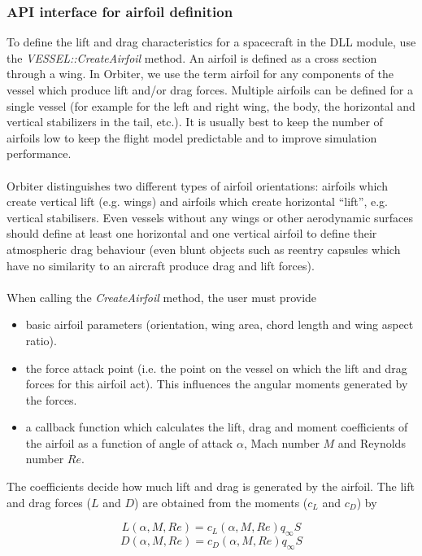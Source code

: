 \documentclass[Orbiter Developer Manual.tex]{subfiles}
\begin{document}
\subsubsection{API interface for airfoil definition}
To define the lift and drag characteristics for a spacecraft in the DLL module, use the \textit{VESSEL::CreateAirfoil} method. An airfoil is defined as a cross section through a wing. In Orbiter, we use the term airfoil for any components of the vessel which produce lift and/or drag forces. Multiple airfoils can be defined for a single vessel (for example for the left and right wing, the body, the horizontal and vertical stabilizers in the tail, etc.). It is usually best to keep the number of airfoils low to keep the flight model predictable and to improve simulation performance.\\
\\
Orbiter distinguishes two different types of airfoil orientations: airfoils which create vertical lift (e.g. wings) and airfoils which create horizontal “lift”, e.g. vertical stabilisers. Even vessels without any wings or other aerodynamic surfaces should define at least one horizontal and one vertical airfoil to define their atmospheric drag behaviour (even blunt objects such as reentry capsules which have no similarity to an aircraft produce drag and lift forces).\\
\\
When calling the \textit{CreateAirfoil} method, the user must provide
\begin{itemize}
\item basic airfoil parameters (orientation, wing area, chord length and wing aspect ratio).
\item the force attack point (i.e. the point on the vessel on which the lift and drag forces for this airfoil act). This influences the angular moments generated by the forces.
\item a callback function which calculates the lift, drag and moment coefficients of the airfoil as a function of angle of attack $\alpha$, Mach number $M$ and Reynolds number $Re$.
\end{itemize}

\noindent
The coefficients decide how much lift and drag is generated by the airfoil. The lift and drag forces ($L$ and $D$) are obtained from the moments ($c_{L}$ and $c_{D}$) by

\[ L(\alpha,M,Re) = c_{L}(\alpha,M,Re)q_{\infty}S \]
\[ D(\alpha,M,Re) = c_{D}(\alpha,M,Re)q_{\infty}S \]
\end{document}
